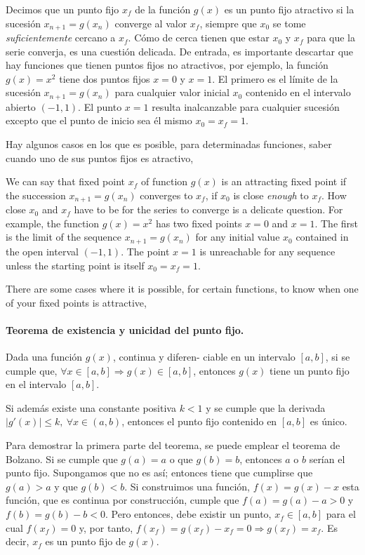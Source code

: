 \begin{paracol}{2}
Decimos que un punto fijo $x_f$ de la función $g(x)$ es un punto fijo atractivo si la sucesión $x_{n+1}=g(x_n)$ converge al valor $x_f$, siempre que $x_0$ se tome \emph{suficientemente} cercano a $x_f$. Cómo de cerca tienen que estar $x_0$ y $x_f$ para que la serie converja, es una cuestión delicada. De entrada, es importante descartar que hay funciones que tienen puntos fijos no atractivos, por ejemplo, la función $g(x)=x^2$ tiene dos puntos fijos $x=0$ y $x=1$. El primero es el límite de la sucesión $x_{n+1}=g(x_n)$ para cualquier valor inicial $x_0$ contenido en el intervalo abierto $(-1,  1)$. El punto $x=1$ resulta inalcanzable para cualquier sucesión excepto que el punto de inicio sea él mismo $x_0=x_f=1$.

Hay algunos casos en los que  es posible, para determinadas funciones, saber cuando uno de sus puntos fijos es atractivo,
\switchcolumn

We can say that fixed point $x_f$ of function $g(x)$ is an attracting  fixed point if the succession $x_{n+1}=g(x_n)$ converges to $x_f$, if $x_0$ is close \emph{enough} to $x_f$. How close $x_0$ and $x_f$ have to be for the series to converge is a delicate question. For example, the function $g(x)=x^2$ has two fixed points $x=0$ and $x=1$. The first is the limit of the sequence $x_{n+1}=g(x_n)$ for any initial value $x_0$ contained in the open interval $(-1, 1)$. The point $x=1$ is unreachable for any sequence unless the starting point is itself $x_0=x_f=1$.

There are some cases where it is possible, for certain functions, to know when one of your fixed points is attractive,

\switchcolumn

\paragraph{Teorema de existencia y unicidad del punto fijo.} Dada una función $g(x)$,  continua y diferen-\- ciable en un intervalo $[a, b]$, si se cumple que, $\forall x \in [a, b] \Rightarrow g(x)\in [a,b]$,  entonces $g(x)$ tiene un punto fijo en el intervalo $[a, b]$. 

Si además existe una constante positiva $k < 1$  y se  cumple que  la derivada $\vert g'(x) \vert \leq k, \  \forall x \in (a, b)$, entonces el punto fijo contenido en $[a,b]$ es único. 

Para demostrar la primera parte del teorema, se puede emplear el teorema de Bolzano. Si se cumple que $g(a)=a$ o que  $g(b)=b$, entonces $a$ o $b$ serían el punto fijo. Supongamos que no es así;  entonces tiene que cumplirse que $g(a)>a$ y que $g(b)<b$. Si construimos una función, $f(x)=g(x)-x$ esta función, que es continua por construcción, cumple que $f(a)=g(a)-a>0$ y $f(b)=g(b)-b<0$. Pero entonces, debe existir un punto, $x_f \in [a, b]$ para el cual $f(x_f)=0$ y, por tanto, $f(x_f)=g(x_f)-x_f=0 \Rightarrow g(x_f)=x_f$. Es decir, $x_f$ es un punto fijo de $g(x)$.


\end{paracol}
